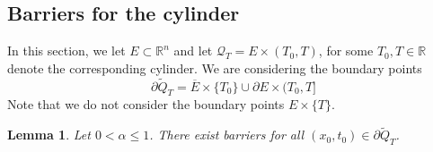 \documentclass[11pt]{article}
\newcommand{\R}{\mathbb{R}}
\providecommand{\Rn}{\mathbb{R}^n}
\providecommand{\cyl}{\mathcal{Q}_{T}}
\newtheorem{lem}[thm]{Lemma}
\numberwithin{equation}{section}
\theoremstyle{definition}
\begin{document}
\subsection{Barriers for the cylinder}\label{sec:barrierscyl}
In this section, we let $E \subset \Rn$ and let $\cyl = E \times (T_0,T)$, for some $T_0, T \in \R$ denote the corresponding cylinder. We are considering the boundary points
\begin{equation*}
    \partial \tilde{Q}_T = \overline{E} \times \{T_0\} \cup \partial E \times (T_0, T]
\end{equation*}
Note that we do not consider the boundary points $E \times \{T\}$.
\begin{lem}\label{lem:barrierscyl}
    Let $0 < \alpha \leq 1$. There exist barriers for all $(x_0,t_0) \in \partial \tilde{Q}_T$.
\end{lem}
\end{document}

